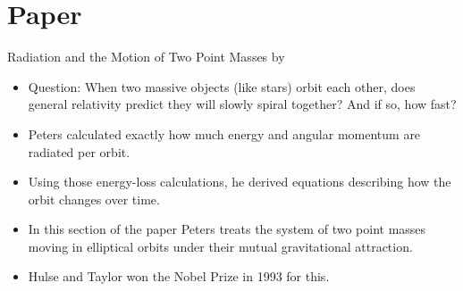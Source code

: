 \documentclass[aspectratio=169]{beamer}
\begin{document}
\section{Paper}
\begin{frame}{Radiation and the Motion of Two Point Masses by \cite{Peters1964}}
    \begin{itemize}
        \item Question: When two massive objects (like stars) orbit each other, does general relativity predict they will slowly spiral together? And if so, how fast?
        \vspace{0.2cm}
        \item Peters calculated exactly how much energy and angular momentum are radiated per orbit.
        \item Using those energy-loss calculations, he derived equations describing how the orbit changes over time.
        \vspace{0.2cm}
        \item In this section of the paper Peters treats the system of two point masses moving in elliptical orbits under their mutual gravitational attraction.
        \vspace{0.2cm}
        \item Hulse and Taylor won the Nobel Prize in 1993 for this. %
    \end{itemize}
\end{frame} 
\end{document}
